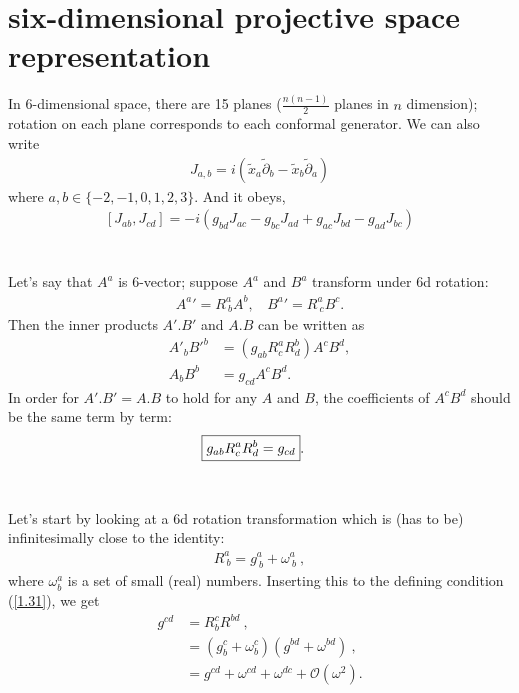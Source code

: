 \documentclass[aps,reprint,notitlepage,nofootinbib,superscriptaddress]{revtex4-1}
\begin{document}
\section{six-dimensional projective space representation}
\label{6times6}
In 6-dimensional space, there are 15 planes ($\frac{n(n-1)}{2}$ planes in $n$ dimension); rotation on each plane corresponds to each conformal generator. We can also write
\begin{align}
   J_{a,b}= i(\tilde{x}_{a}\tilde{\partial}_{b}-\tilde{x}_{b}\tilde{\partial}_{a})\label{6rotation}
\end{align}
where $a,b\in\{-2,-1,0,1,2,3\}$. And it obeys,
 \begin{align}\label{algebrasimp}
      \left[J_{{a}{b}},J_{{c}{d}}\right]=-i\left(g_{{b}{d}}J_{{a}{c}}-g_{{b}{c}}J_{{a}{d}}+g_{{a}{c}}J_{{b}{d}}-g_{{a}{d}}J_{{b}{c}}\right)
  \end{align}
\\
\\
Let's say that $A^a$ is 6-vector; suppose $A^a$ and $B^a$ transform under 6d rotation:
\begin{align}
    A^a'=R^a_{~b} A^b,~~~~B^a'=R^a_{~c} B^c.
\end{align}
Then the inner products $A'.B'$ and $A.B$ can be written as
\begin{align}
    A'_b B'^b&=(g_{ab}R^a_c R^b_d)A^c B^d,\\
    A_b B^b&=g_{cd}A^c B^d.
\end{align}
In order for $A'.B'=A.B$ to hold for any $A$ and $B$, the coefficients of $A^c B^d$ should be the same term by term:
\begin{align}
    \Aboxed{g_{ab}R^a_c R^b_d=g_{cd}}\label{1.31}.
\end{align}
\\
\\
Let’s start by looking at a 6d rotation transformation which is (has to be) infinitesimally close to the identity:
\begin{align}
    R^a_{~b}=g^a_{~b}+\omega^a_{~b}\label{1.80}~,
\end{align}
where $\omega^a_b$ is a set of small (real) numbers. Inserting this to the defining condition (\eqref{1.31}), we get
\begin{align}
    g^{cd}&=R_{b}^cR^{bd}~,\\
    &=(g_{b}^{c}+\omega_{b}^{c})(g^{bd}+\omega^{bd})~,\nonumber\\
    &=g^{cd}+\omega^{cd}+\omega^{dc}+\mathcal{O}(\omega^2).
\end{align}
\end{document}
